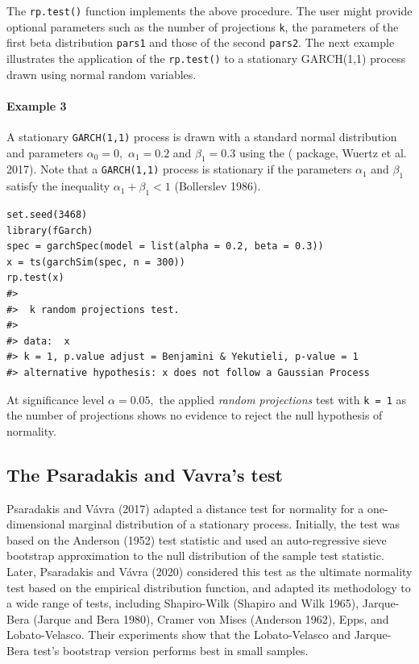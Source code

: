 The \texttt{rp.test()} function implements the above procedure. The user might provide optional parameters such as the number of projections \texttt{k}, the parameters of the first beta distribution \texttt{pars1} and those of the second \texttt{pars2}. The next example illustrates the application of the \texttt{rp.test()} to a stationary GARCH(1,1) process drawn using normal random variables.

\hypertarget{example-3}{%
\paragraph{Example 3}\label{example-3}}

A stationary \texttt{GARCH(1,1)} process is drawn with a standard normal distribution and parameters \(\alpha_0 = 0,\) \(\alpha_1 = 0.2\) and \(\beta_1 = 0.3\) using the ( package, Wuertz et al. 2017). Note that a \texttt{GARCH(1,1)} process is stationary if the parameters \(\alpha_1\) and \(\beta_1\) satisfy the inequality \(\alpha_1 + \beta_1 < 1\) (Bollerslev 1986).

\begin{verbatim}
set.seed(3468)
library(fGarch)
spec = garchSpec(model = list(alpha = 0.2, beta = 0.3))
x = ts(garchSim(spec, n = 300))
rp.test(x) 
#> 
#>  k random projections test.
#> 
#> data:  x
#> k = 1, p.value adjust = Benjamini & Yekutieli, p-value = 1
#> alternative hypothesis: x does not follow a Gaussian Process
\end{verbatim}

At significance level \(\alpha = 0.05,\) the applied \emph{random projections} test with \texttt{k\ =\ 1} as the number of projections shows no evidence to reject the null hypothesis of normality.

\hypertarget{the-psaradakis-and-vavras-test}{%
\subsection{The Psaradakis and Vavra's test}\label{the-psaradakis-and-vavras-test}}

Psaradakis and Vávra (2017) adapted a distance test for normality for a one-dimensional marginal distribution of a stationary process. Initially, the test was based on the Anderson (1952) test statistic and used an auto-regressive sieve bootstrap approximation to the null distribution of the sample test statistic. Later, Psaradakis and Vávra (2020) considered this test as the ultimate normality test based on the empirical distribution function, and adapted its methodology to a wide range of tests, including Shapiro-Wilk (Shapiro and Wilk 1965), Jarque-Bera (Jarque and Bera 1980), Cramer von Mises (Anderson 1962), Epps, and Lobato-Velasco. Their experiments show that the Lobato-Velasco and Jarque-Bera test's bootstrap version performs best in small samples.

